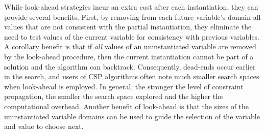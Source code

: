 \documentclass{article}
\begin{document}
While look-ahead strategies incur an extra cost after each instantiation, they
can provide several benefits. First, by removing from each future variable's domain all values that are not consistent with the partial instantiation, they eliminate the need to test values of the current variable for consistency with previous
variables. A corollary benefit is that if \textit{all} values of an uninstantiated variable
are removed by the look-ahead procedure, then the current instantiation cannot
be part of a solution and the algorithm can backtrack. Consequently, dead-ends
occur earlier in the search, and users of CSP algorithms often note much smaller
search spaces when look-ahead is employed. In general, the stronger the level
of constraint propagation, the smaller the search space explored and the higher
the computational overhead. Another benefit of look-ahead is that the sizes of
the uninstantiated variable domains can be used to guide the selection of the
variable and value to choose next.
\end{document}
